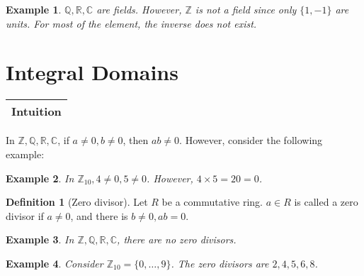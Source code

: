 \documentclass{article}
\theoremstyle{MyNonumberplain}
\theoremstyle{break}
\theoremstyle{break}
\newtheorem{example}{Example}[section]
\theoremstyle{break}
\theoremstyle{definition}
\theoremstyle{break}
\newtheorem{definition}{Definition}[section]
\begin{document}
\begin{expbox}
    \begin{example}
        $\mathbb{Q}, \mathbb{R}, \mathbb{C}$ are fields. However, $\mathbb{Z}$ is not a field since only $\{1,-1\}$ are units. For most of the element, the inverse does not exist.
    \end{example}
\end{expbox}

\newpage

\section{Integral Domains}

\begin{tabular}{|c|}
    \hline
    Intuition\\
    \hline
  \end{tabular}
  
  In $\mathbb{Z}, \mathbb{Q}, \mathbb{R}, \mathbb{C}$, if $a \neq 0, b \neq 0$,
  then $a b \neq 0$. However, consider the following example:
  
\begin{expbox}
    \begin{example}
        In $\mathbb{Z}_{10}, 4 \neq 0, 5 \neq 0$. However, $4 \times 5 = 20 = 0$.
      \end{example}
\end{expbox}

\begin{defbox}
    \begin{definition}[Zero divisor]
        Let $R$ be a commutative ring. $a \in R$ is called a zero divisor if $a \neq
        0$, and there is $b \neq 0, a b = 0$.
    \end{definition}
\end{defbox}

\begin{expbox}
    \begin{example}
        In $\mathbb{Z}, \mathbb{Q}, \mathbb{R}, \mathbb{C}$, there are no zero
        divisors.
    \end{example}
\end{expbox}

\begin{expbox}
    \begin{example}
        Consider $\mathbb{Z}_{10} = \{ 0, \ldots, 9 \}$. The zero divisors are $2, 4,
        5, 6, 8$. 
    \end{example}
\end{expbox}
\end{document}
